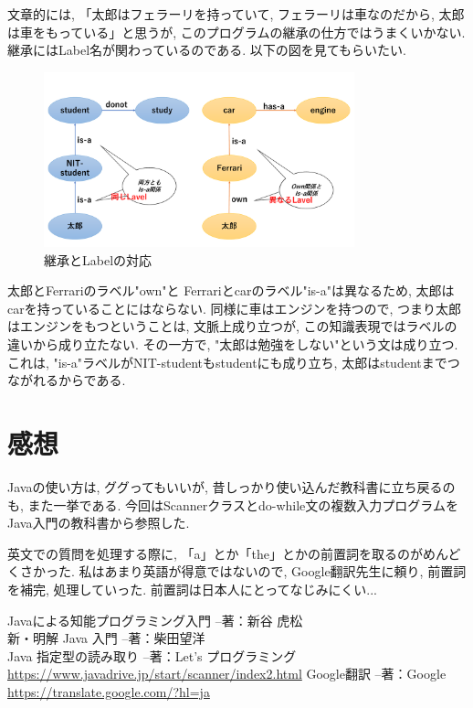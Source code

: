 ﻿\documentclass[uplatex,12pt]{jsarticle}
\begin{document}
文章的には, 「太郎はフェラーリを持っていて, フェラーリは車なのだから, 太郎は車をもっている」と思うが, このプログラムの継承の仕方ではうまくいかない. 継承にはLabel名が関わっているのである. 以下の図を見てもらいたい.
\begin{figure}[htbp]
 \begin{center}
  \includegraphics[width = 9cm, pagebox = cropbox, clip]{継承とLabelの対応.pdf}
 \end{center}
 \caption[]{継承とLabelの対応}\label{fig:fig1.1}
\end{figure}

太郎とFerrariのラベル"own"と Ferrariとcarのラベル"is-a"は異なるため, 太郎はcarを持っていることにはならない. 同様に車はエンジンを持つので, つまり太郎はエンジンをもつということは, 文脈上成り立つが, この知識表現ではラベルの違いから成り立たない. その一方で, "太郎は勉強をしない"という文は成り立つ. これは, "is-a"ラベルがNIT-studentもstudentにも成り立ち, 太郎はstudentまでつながれるからである.


\section{感想}
Javaの使い方は, ググってもいいが, 昔しっかり使い込んだ教科書に立ち戻るのも, また一挙である. 今回はScannerクラスとdo-while文の複数入力プログラムをJava入門の教科書から参照した.

英文での質問を処理する際に, 「a」とか「the」とかの前置詞を取るのがめんどくさかった. 私はあまり英語が得意ではないので, Google翻訳先生に頼り, 前置詞を補完, 処理していった. 前置詞は日本人にとってなじみにくい...

\begin{thebibliography}{99}
 Javaによる知能プログラミング入門 --著：新谷 虎松 \\
 新・明解 Java 入門 --著：柴田望洋 \\
 Java 指定型の読み取り --著：Let's プログラミング \\
\url{https://www.javadrive.jp/start/scanner/index2.html}
 Google翻訳 --著：Google \\
\url{https://translate.google.com/?hl=ja}
\end{thebibliography}
\end{document}
